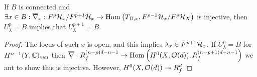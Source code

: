 \documentclass[12pt]{article}
\begin{document}
\begin{lemma}
If $B$ is connected and $\exists x \in B : \overline{\nabla}_x : F^p \mathcal{H}_x / F^{p+1} \mathcal{H}_x \to \mathrm{Hom}_{} \left( T_{B,x}, F^{p-1} \mathcal{H}_x / F^p \mathcal{H}_X \right)$ is injective, then $U_\lambda^p = B$ implies that $U_\lambda^{p+1} = B$.
\end{lemma}

\begin{proof}
The locus of such $x$ is open, and this implies $\lambda_x \in F^{p+1} \mathcal{H}_x$.
If $U^p_\lambda = B$ for $H^{n-1}(Y, \mathbb{C})_{\mathrm{van}}$ then $\overline{\nabla} : R_f^{(n-p)d - n - 1} \to \mathrm{Hom}_{} \left( H^0(X, \mathcal{O}_{}(d)), R_f^{(n-p+1)d - n - 1} \right)$ we ant to show this is injective. However, $H^0(X, \mathcal{O}_{}(d)) \twoheadrightarrow R^d_f$ 
\end{proof}
\end{document}
